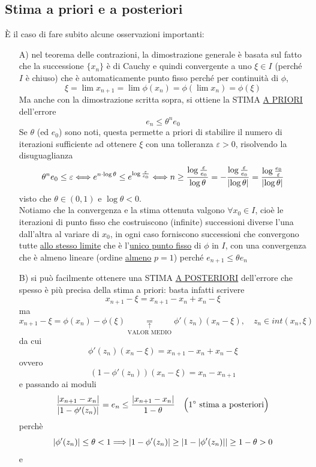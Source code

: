 \documentclass[12pt]{article}
\DeclarePairedDelimiter{\abs}{\lvert}{\rvert}
\begin{document}
\subsection{Stima a priori e a posteriori}
È il caso di fare subito alcune osservazioni importanti: 
\begin{enumerate}
    \item [A)] nel teorema delle contrazioni, la dimostrazione generale è basata sul fatto che la successione $\{ x_n \}$ è di Cauchy e quindi convergente a uno $\xi \in I$ (perché $I$ è chiuso) che è automaticamente punto fisso perché per continuità di $\phi$, 
    \[\xi = \lim x_{n+1} = \lim \phi(x_n) = \phi(\lim x_n) = \phi(\xi)\]
    Ma anche con la dimostrazione scritta sopra, si ottiene la STIMA \uline{A PRIORI} dell'errore \[e_n \leq \theta^n e_0\]
    Se $\theta$ (ed $e_0$) sono noti, questa permette a priori di stabilire il numero di iterazioni sufficiente ad ottenere $\xi$ con una tolleranza $\varepsilon > 0$, risolvendo la disuguaglianza
    \[\theta^n e_0 \leq \varepsilon \Longleftrightarrow e^{n\cdot \log{\theta}} \leq e^{\log{\frac{\varepsilon}{e_0}}} \Longleftrightarrow n \geq \frac{\log{\frac{\varepsilon}{e_0}}}{\log{\theta}} = -\frac{\log{\frac{\varepsilon}{e_0}}}{\abs{\log{\theta}}} = \frac{\log{\frac{e_0}{\varepsilon}}}{\abs{\log{\theta}}}\]
    visto che $\theta \in (0,1)$ e $\log{\theta} < 0$.\\
    Notiamo che la convergenza e la stima ottenuta valgono $\forall x_0 \in I$, cioè le iterazioni di punto fisso che costruiscono (infinite) successioni diverse l'una dall'altra al variare di $x_0$, in ogni caso forniscono successioni che convergono tutte \uline{allo stesso limite} che è l'\uline{unico punto fisso} di $\phi$ in $I$, con una convergenza che è almeno lineare (ordine \uline{almeno} $p=1$) perché $e_{n+1} \leq \theta e_n$
    \item [B)] si può facilmente ottenere una STIMA \uline{A POSTERIORI} dell'errore che spesso è più precisa della stima a priori: basta infatti scrivere
    \[ x_{n+1} - \xi = x_{n+1} - x_n + x_n - \xi \] ma 
    \[x_{n+1}-\xi =\phi(x_n) - \phi(\xi) \underset{\text{VALOR  MEDIO}}{\underset{\uparrow}{=}} \phi'(z_n)(x_n - \xi), \quad z_n \in int(x_n,\xi) \] da cui 
    \[ \phi'(z_n)(x_n - \xi) = x_{n+1}-x_n+x_n-\xi \] ovvero 
    \[ (1-\phi'(z_n))(x_n - \xi) = x_n-x_{n+1} \]
    e passando ai moduli
    \[\frac{\abs{x_{n+1}-x_n}}{\abs{1-\phi'(z_n)}} = e_n \le \frac{\abs{x_{n+1}-x_n}}{1-\theta} \quad \Bigl( 1^\circ \text{ stima a posteriori}\Bigr)\] perchè 
    \[ \abs{\phi'(z_n)} \le \theta < 1 \Longrightarrow \abs{1-\phi'(z_n)} \ge \abs{1-\abs{\phi'(z_n)}} \ge 1 - \theta > 0\] e 

\end{enumerate}
\end{document}
